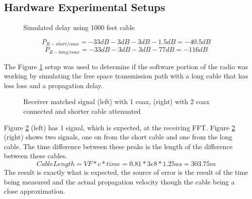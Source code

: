 \documentclass[letterpaper, 12 pt, conference]{report}
\numberwithin{figure}{section}
\begin{document}
\subsection{Hardware Experimental Setups}
\begin{figure}[h]
\centering{}
\caption{Simulated delay using 1000 feet cable}
\label{fig:cableex}
\end{figure}
\[P_{R-short/coax}=-33dB-3dB-3dB-1.5dB= -40.5dB\]
\[P_{R-long/coax}=-33dB-3dB-3dB-77dB= -116dB\]

The Figure \ref{fig:cableex} setup was used to determine if the software portion of the radio was working by simulating the free space transmission path with a long cable that has less loss and a propagation delay.
\begin{figure}[h]
\noindent{}
\noindent{}
\caption{Receiver matched signal (left) with 1 coax, (right) with 2 coax connected and shorter cable attenuated}
\label{fig:oneandms80}
\end{figure}
Figure \ref{fig:oneandms80} (left) has 1 signal, which is expected, at the receiving FFT. Figure \ref{fig:oneandms80} (right) shows two signals, one on from the short cable and one from the long cable. The time difference between these peaks is the length of the difference between these cables.
\[Cable Length = VF*c*time = 0.81 * 3e8*1.25us = 303.75m\]
The result is exactly what is expected, the source of error is the result of the time being measured and the actual propagation velocity though the cable being a close approximation.
\end{document}
